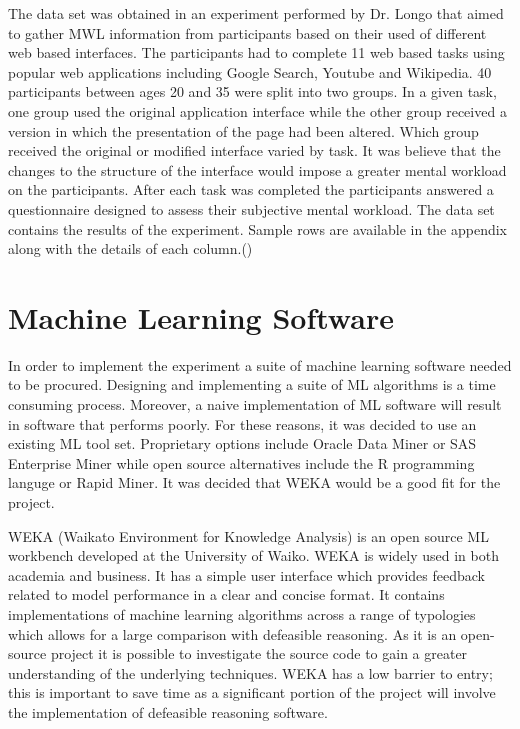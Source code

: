 The data set was obtained in an experiment performed by Dr. Longo that aimed to gather MWL information from participants based on their used of different web based interfaces. The participants had to complete 11 web based tasks using popular web applications including Google Search, Youtube and Wikipedia. 40 participants between ages 20 and 35 were split into two groups. In a given task, one group used the original application interface while the other group received a version in which the presentation of the page had been altered. Which group received the original or modified interface varied by task. It was believe that the changes to the structure of the interface would impose a greater mental workload on the participants. After each task was completed the participants answered a questionnaire designed to assess their subjective mental workload. The data set contains the results of the experiment. Sample rows are available in the appendix along with the details of each column.(\citep{longo2014formalising})

\section{Machine Learning Software}

In order to implement the experiment a suite of machine learning software needed to be procured. Designing and implementing a suite of ML algorithms is a time consuming process. Moreover, a naive implementation of ML software will result in software that performs poorly. For these reasons, it was decided to use an existing ML tool set. Proprietary options include Oracle Data Miner or SAS Enterprise Miner while open source alternatives include the R programming languge or Rapid Miner. It was decided that WEKA would be a good fit for the project. 

WEKA (Waikato Environment for Knowledge Analysis) is an open source ML workbench developed at the University of Waiko. WEKA is widely used in both academia and business. It has a simple user interface which provides feedback related to model performance in a clear and concise format. It contains implementations of machine learning algorithms across a range of typologies which allows for a large comparison with defeasible reasoning. As it is an open-source project it is possible to investigate the source code to gain a greater understanding of the underlying techniques. WEKA has a low barrier to entry; this is important to save time as a significant portion of the project will involve the implementation of defeasible reasoning software.

